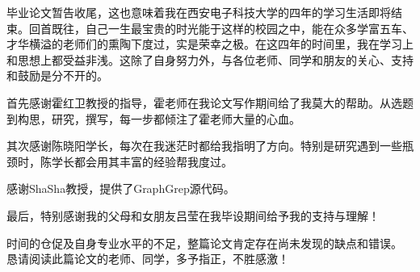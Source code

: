 \documentclass{XDBAthesis}
\begin{document}
\else
\fi

\begin{thanks}

毕业论文暂告收尾，这也意味着我在西安电子科技大学的四年的学习生活即将结束。回首既往，自己一生最宝贵的时光能于这样的校园之中，能在众多学富五车、才华横溢的老师们的熏陶下度过，实是荣幸之极。在这四年的时间里，我在学习上和思想上都受益非浅。这除了自身努力外，与各位老师、同学和朋友的关心、支持和鼓励是分不开的。

首先感谢霍红卫教授的指导，霍老师在我论文写作期间给了我莫大的帮助。从选题到构思，研究，撰写，每一步都倾注了霍老师大量的心血。

其次感谢陈晓阳学长，每次在我迷茫时都给我指明了方向。特别是研究遇到一些瓶颈时，陈学长都会用其丰富的经验帮我度过。


感谢ShaSha教授，提供了GraphGrep源代码。

最后，特别感谢我的父母和女朋友吕莹在我毕设期间给予我的支持与理解！

时间的仓促及自身专业水平的不足，整篇论文肯定存在尚未发现的缺点和错误。
恳请阅读此篇论文的老师、同学，多予指正，不胜感激！


\end{thanks}

\ifx\allfiles\undefined
%

\end{document}
